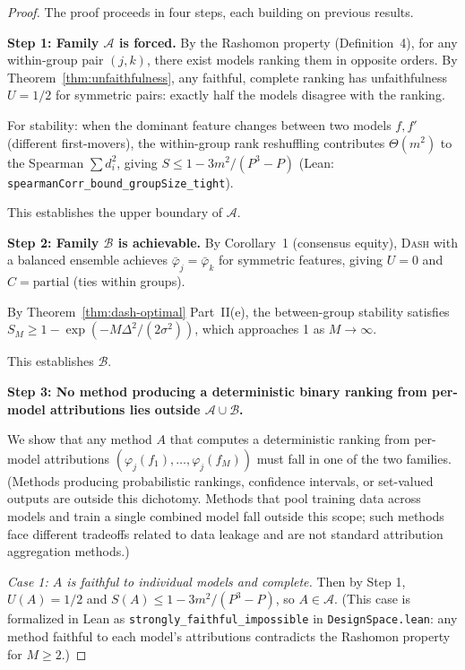 \documentclass{article}
\newcommand{\DASH}{\textsc{Dash}}
\begin{document}
\begin{proof}
The proof proceeds in four steps, each building on previous results.

\textbf{Step 1: Family $\mathcal{A}$ is forced.}
By the Rashomon property (Definition~4), for any within-group pair
$(j,k)$, there exist models ranking them in opposite orders.
By Theorem~\ref{thm:unfaithfulness}, any faithful, complete ranking
has unfaithfulness $U = 1/2$ for symmetric pairs: exactly half the
models disagree with the ranking.

For stability: when the dominant feature changes between two models
$f, f'$ (different first-movers), the within-group rank reshuffling
contributes $\Theta(m^2)$ to the Spearman $\sum d_i^2$, giving
$S \leq 1 - 3m^2/(P^3{-}P)$ (Lean: \texttt{spearmanCorr\_bound\_group\-Size\_tight}).

This establishes the upper boundary of $\mathcal{A}$.

\textbf{Step 2: Family $\mathcal{B}$ is achievable.}
By Corollary~1 (consensus equity), \DASH{} with a balanced ensemble
achieves $\bar\varphi_j = \bar\varphi_k$ for symmetric features,
giving $U = 0$ and $C = \text{partial}$ (ties within groups).

By Theorem~\ref{thm:dash-optimal} Part~II(e), the between-group
stability satisfies
$S_M \geq 1 - \exp(-M\Delta^2/(2\sigma^2))$,
which approaches 1 as $M \to \infty$.

This establishes $\mathcal{B}$.

\textbf{Step 3: No method producing a deterministic binary ranking from per-model attributions lies outside $\mathcal{A} \cup \mathcal{B}$.}

We show that any method $A$ that computes a deterministic ranking from per-model
attributions $(\varphi_j(f_1), \ldots, \varphi_j(f_M))$ must fall
in one of the two families. (Methods producing probabilistic rankings, confidence intervals, or set-valued outputs are outside this dichotomy. Methods that pool training data across
models and train a single combined model fall outside this scope;
such methods face different tradeoffs related to data leakage and
are not standard attribution aggregation methods.)

\emph{Case 1: $A$ is faithful to individual models and complete.}
Then by Step 1, $U(A) = 1/2$ and $S(A) \leq 1 - 3m^2/(P^3{-}P)$,
so $A \in \mathcal{A}$.
(This case is formalized in Lean as \texttt{strongly\_faithful\_impossible}
in \texttt{DesignSpace.lean}: any method faithful to each model's
attributions contradicts the Rashomon property for $M \geq 2$.)


\end{proof}
\end{document}
